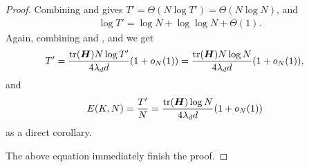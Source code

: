 \begin{proof}
Combining  and  gives $T'=\Theta\left(N\log T'\right)=\Theta(N\log N)$, and 
\begin{align}
    \log T' = \log N + \log\log N +\Theta(1). \label{equ:strongly-convex-T'-N}
\end{align}
Again, combining  and , and we get
\begin{align*}
    &T' = \frac{\mathrm{tr}({\bm{H}})N\log T'}{4\lambda_d d}(1+o_N(1)) =\frac{\mathrm{tr}({\bm{H}})N\log N}{4\lambda_d d}(1+o_N(1)),
\end{align*}
and 
\begin{align*}
    E(K, N)&=\frac{T'}{N} = \frac{\mathrm{tr}({\bm{H}})\log N}{4\lambda_d d}(1+o_N(1))
\end{align*}
as a direct corollary.

The above equation immediately finish the proof.
\end{proof}

